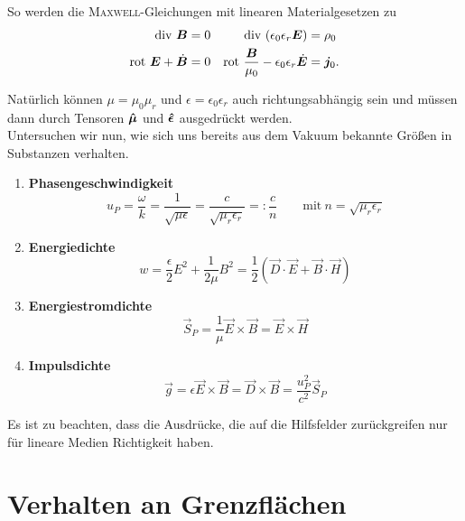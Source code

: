 So werden die \textsc{Maxwell}-Gleichungen mit linearen Materialgesetzen zu
\begin{align*}
\text{div }\bm{B}&=0 &\text{div }(\epsilon_0\epsilon_r\bm{E})&=\rho_0\\
\text{rot } \bm{E}+\dot{\bm{B}}&=0 &\text{rot }\frac{\bm{B}}{\mu_0}-\epsilon_0\epsilon_r\dot{\bm{E}}&=\bm{j}_0.
\end{align*}

Natürlich können $\mu=\mu_0\mu_r$ und $\epsilon=\epsilon_0\epsilon_r$ auch richtungsabhängig sein und müssen dann durch Tensoren $\bm{\hat{\mu}}$ und $\bm{\hat{\epsilon}}$ ausgedrückt werden.\\

Untersuchen wir nun, wie sich uns bereits aus dem Vakuum bekannte Größen in Substanzen verhalten.
\begin{enumerate}
		\item \textbf{Phasengeschwindigkeit}
		\begin{equation*}
		u_P=\frac{\omega}{k}=\frac{1}{\sqrt{\mu\epsilon}}=\frac{c}{\sqrt{\mu_r\epsilon_r}} =: \frac{c}{n}\quad\quad\text{mit}\ n=\sqrt{\mu_r\epsilon_r}
		\end{equation*}
		\item \textbf{Energiedichte}
		\begin{equation*}
		w=\frac{\epsilon}{2}E^2 + \frac{1}{2\mu}B^2 = \frac{1}{2}\left(\vec{D}\cdot\vec{E}+\vec{B}\cdot\vec{H}\right)
		\end{equation*}
		\item \textbf{Energiestromdichte}
		\begin{equation*}
		\vec{S}_P = \frac{1}{\mu}\vec{E}\times\vec{B} = \vec{E}\times\vec{H}
		\end{equation*}
		\item \textbf{Impulsdichte}
		\begin{equation*}
		\vec{g}=\epsilon\vec{E}\times\vec{B}=\vec{D}\times\vec{B}=\frac{u_P^2}{c^2}\vec{S}_P
		\end{equation*}
\end{enumerate}
Es ist zu beachten, dass die Ausdrücke, die auf die Hilfsfelder zurückgreifen nur für lineare Medien Richtigkeit haben.
\newpage
\section{Verhalten an Grenzflächen}

